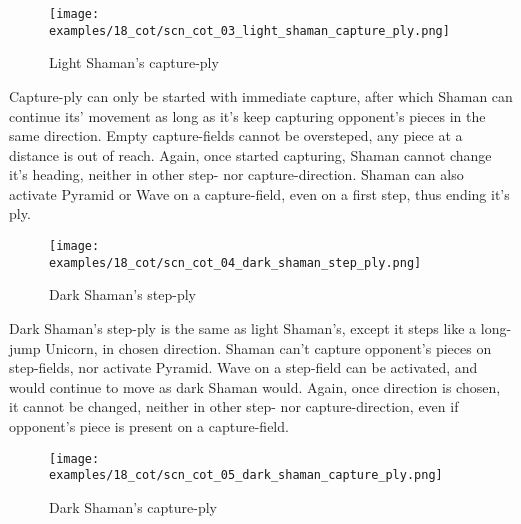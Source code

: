 \clearpage %

\noindent
\begin{figure}[!h]
\texttt{[image: examples/18\_cot/scn\_cot\_03\_light\_shaman\_capture\_ply.png]}
\caption{Light Shaman's capture-ply}
\label{fig:scn_cot_03_light_shaman_capture_ply}
\end{figure}

Capture-ply can only be started with immediate capture, after which Shaman
can continue its' movement as long as it's keep capturing opponent's pieces
in the same direction. Empty capture-fields cannot be oversteped, any piece
at a distance is out of reach. Again, once started capturing, Shaman cannot
change it's heading, neither in other step- nor capture-direction. Shaman
can also activate Pyramid or Wave on a capture-field, even on a first step,
thus ending it's ply.

\clearpage %

\noindent
\begin{figure}[!h]
\texttt{[image: examples/18\_cot/scn\_cot\_04\_dark\_shaman\_step\_ply.png]}
\caption{Dark Shaman's step-ply}
\label{fig:scn_cot_04_dark_shaman_step_ply}
\end{figure}

Dark Shaman's step-ply is the same as light Shaman's, except it steps like a
long-jump Unicorn, in chosen direction. Shaman can't capture opponent's pieces
on step-fields, nor activate Pyramid. Wave on a step-field can be activated,
and would continue to move as dark Shaman would. Again, once direction is
chosen, it cannot be changed, neither in other step- nor capture-direction,
even if opponent's piece is present on a capture-field.

\clearpage %

\noindent
\begin{figure}[!h]
\texttt{[image: examples/18\_cot/scn\_cot\_05\_dark\_shaman\_capture\_ply.png]}
\caption{Dark Shaman's capture-ply}
\label{fig:scn_cot_05_dark_shaman_capture_ply}
\end{figure}

